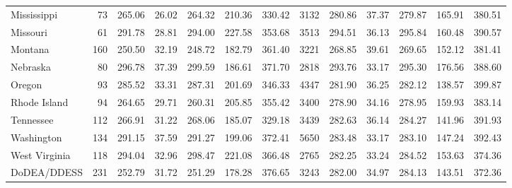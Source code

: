 \begin{sidewaystable}[ht]
\begin{tabular}{lrrrrrr@{\extracolsep{10pt}}rrrrrr}
  Mississippi &  73 & 265.06 & 26.02 & 264.32 & 210.36 & 330.42 & 3132 & 280.86 & 37.37 & 279.87 & 165.91 & 380.51 \\ 
  Missouri &  61 & 291.78 & 28.81 & 294.00 & 227.58 & 353.68 & 3513 & 294.51 & 36.13 & 295.84 & 160.48 & 390.57 \\ 
  Montana & 160 & 250.50 & 32.19 & 248.72 & 182.79 & 361.40 & 3221 & 268.85 & 39.61 & 269.65 & 152.12 & 381.41 \\ 
  Nebraska &  80 & 296.78 & 37.39 & 299.59 & 186.61 & 371.70 & 2818 & 293.76 & 33.17 & 295.30 & 176.56 & 388.60 \\ 
  Oregon &  93 & 285.52 & 33.31 & 287.31 & 201.69 & 346.33 & 4347 & 281.90 & 36.25 & 282.12 & 138.57 & 399.87 \\ 
  Rhode Island &  94 & 264.65 & 29.71 & 260.31 & 205.85 & 355.42 & 3400 & 278.90 & 34.16 & 278.95 & 159.93 & 383.14 \\ 
  Tennessee & 112 & 266.91 & 31.22 & 268.06 & 185.07 & 329.18 & 3439 & 282.63 & 36.14 & 284.27 & 141.96 & 391.93 \\ 
  Washington & 134 & 291.15 & 37.59 & 291.27 & 199.06 & 372.41 & 5650 & 283.48 & 33.17 & 283.10 & 147.24 & 392.43 \\ 
  West Virginia & 118 & 294.04 & 32.96 & 298.47 & 221.08 & 366.48 & 2765 & 282.25 & 33.24 & 284.52 & 153.63 & 374.36 \\ 
  DoDEA/DDESS & 231 & 252.79 & 31.72 & 251.29 & 178.28 & 376.65 & 3243 & 282.00 & 34.97 & 284.13 & 143.51 & 372.36 \\ 
   \hline
\end{tabular}
\end{sidewaystable}
